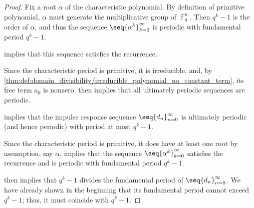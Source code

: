 \begin{proof}
   Fix a root \( \alpha \) of the characteristic polynomial. By definition of primitive polynomial, \( \alpha \) must generate the multiplicative group of \( \BbbF_q^k \). Then \( q^k - 1 \) is the order of \( \alpha \), and thus the sequence \( \seq{ \alpha^k }_{k=0}^\infty \) is periodic with fundamental period \( q^k - 1 \).

   implies that this sequence satisfies the recurrence.

  Since the characteristic period is primitive, it is irreducible, and, by \cref{thm:def:domain_divisibility/irreducible_polynomial_no_constant_term}, its free term \( a_0 \) is nonzero.  then implies that all ultimately periodic sequences are periodic.

    implies that the impulse response sequence \( \seq{ d_n }_{n=0}^\infty \) is ultimately periodic (and hence periodic) with period at most \( q^k - 1 \).

  Since the characteristic period is primitive, it does have at least one root by assumption, say \( \alpha \).  implies that the sequence \( \seq{ \alpha^k }_{k=0}^\infty \) satisfies the recurrence and is periodic with fundamental period \( q^k - 1 \).

   then implies that \( q^k - 1 \) divides the fundamental period of \( \seq{ d_n }_{n=0}^\infty \). We have already shown in the beginning that its fundamental period cannot exceed \( q^k - 1 \); thus, it must coincide with \( q^k - 1 \).
\end{proof}

